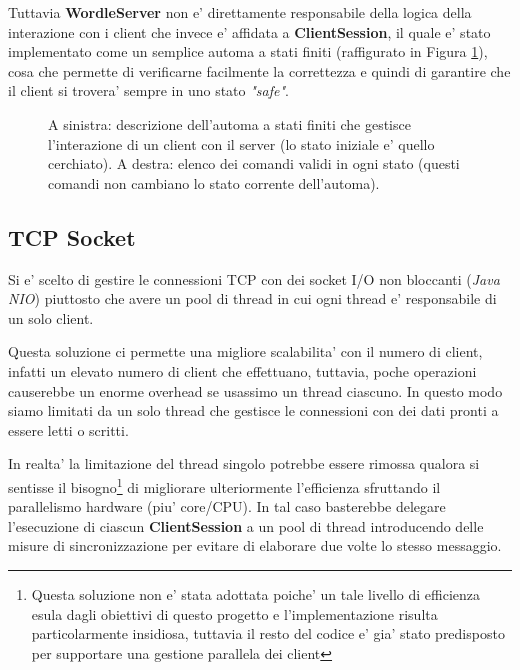Tuttavia \textbf{WordleServer} non e' direttamente responsabile della logica della interazione con i client che invece e' affidata a \textbf{ClientSession}, il quale e' stato implementato come un semplice automa a stati finiti (raffigurato in Figura \ref{fig:clientsession_asf}), cosa che permette di verificarne facilmente la correttezza e quindi di garantire che il client si trovera' sempre in uno stato \emph{"safe"}.

\begin{center}
	\begin{figure}[t!]
		\caption{A sinistra: descrizione dell'automa a stati finiti che gestisce l'interazione di un client con il server (lo stato iniziale e' quello cerchiato). A destra: elenco dei comandi validi in ogni stato (questi comandi non cambiano lo stato corrente dell'automa).}
		\label{fig:clientsession_asf}
	\end{figure}
\end{center}

\subsection{TCP Socket}

Si e' scelto di gestire le connessioni TCP con dei socket I/O non bloccanti (\emph{Java NIO}) piuttosto che avere un pool di thread in cui ogni thread e' responsabile di un solo client.

Questa soluzione ci permette una migliore scalabilita' con il numero di client, infatti un elevato numero di client che effettuano, tuttavia, poche operazioni causerebbe un enorme overhead se usassimo un thread ciascuno. In questo modo siamo limitati da un solo thread che gestisce le connessioni con dei dati pronti a essere letti o scritti.

In realta' la limitazione del thread singolo potrebbe essere rimossa qualora si sentisse il bisogno\footnote{Questa soluzione non e' stata adottata poiche' un tale livello di efficienza esula dagli obiettivi di questo progetto e l'implementazione risulta particolarmente insidiosa, tuttavia il resto del codice e' gia' stato predisposto per supportare una gestione parallela dei client} di migliorare ulteriormente l'efficienza sfruttando il parallelismo hardware (piu' core/CPU). In tal caso basterebbe delegare l'esecuzione di ciascun \textbf{ClientSession} a un pool di thread introducendo delle misure di sincronizzazione per evitare di elaborare due volte lo stesso messaggio.

